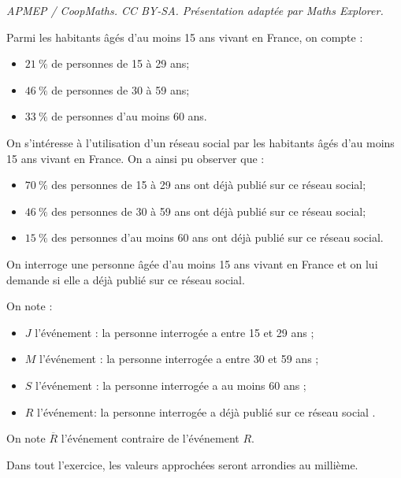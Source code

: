 \documentclass[10pt]{article}
\begin{document}
\noindent\textit{APMEP / CoopMaths. CC BY-SA. Présentation adaptée par Maths Explorer.}\par\medskip
Parmi les habitants âgés d'au moins 15 ans vivant en France, on compte :

\begin{itemize}[label=\textbullet~]
	\item $21~\%$ de personnes de 15 à 29 ans;
	\item $46~\%$ de personnes de 30 à 59 ans;
	\item $33~\%$ de personnes d'au moins 60 ans.
\end{itemize}

On s'intéresse à l'utilisation d'un réseau social par les habitants âgés d'au moins 15 ans vivant en France. On a ainsi pu observer que :

\begin{itemize}[label=\textbullet~]
	\item $70~\%$ des personnes de 15 à 29 ans ont déjà publié sur ce réseau social;
	\item $46~\%$ des personnes de 30 à 59 ans ont déjà publié sur ce réseau social;
	\item $15~\%$ des personnes d'au moins 60 ans ont déjà publié sur ce réseau social.
\end{itemize}

On interroge une personne âgée d'au moins 15 ans vivant en France et on lui demande si elle a déjà publié sur ce réseau social.

On note :

\begin{itemize}[label=\textbullet~]
	\item $J$ l'événement : \og la personne interrogée a entre 15 et 29 ans \fg{};
	\item $M$ l'événement : \og la personne interrogée a entre 30 et 59 ans \fg{};
	\item $S$ l'événement : \og la personne interrogée a au moins 60 ans \fg{};
	\item $R$ l'événement: \og la personne interrogée a déjà publié sur ce réseau social \fg{}.
\end{itemize}

On note $\overline{R}$ l'événement contraire de l'événement $R$.

Dans tout l'exercice, les valeurs approchées seront arrondies au millième.
\end{document}
